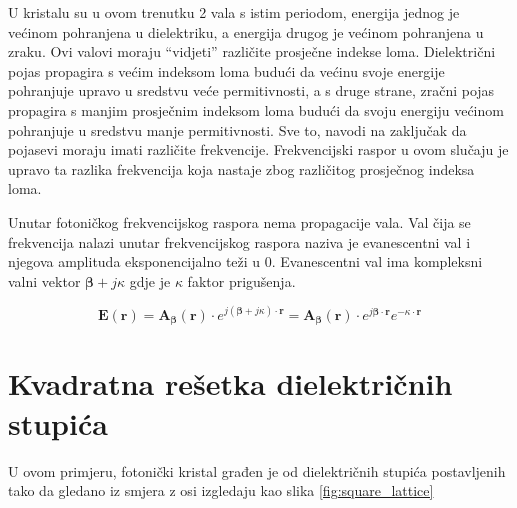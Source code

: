 \documentclass[utf8, seminar, numeric]{fer}
\begin{document}
U kristalu su u ovom trenutku 2 vala s istim periodom, energija jednog je
većinom pohranjena u dielektriku, a energija drugog je većinom pohranjena
u zraku. Ovi valovi moraju ``vidjeti'' različite prosječne indekse loma.
Dielektrični pojas propagira s većim indeksom loma budući da većinu svoje energije
pohranjuje upravo u sredstvu veće permitivnosti, a s druge strane, zračni pojas
propagira s manjim prosječnim indeksom loma budući da svoju energiju
većinom pohranjuje u sredstvu manje permitivnosti. Sve to, navodi na zaključak
da pojasevi moraju imati različite frekvencije. Frekvencijski raspor u ovom
slučaju je upravo ta razlika frekvencija koja nastaje zbog različitog prosječnog
indeksa loma.

\FloatBarrier
Unutar fotoničkog frekvencijskog raspora nema propagacije vala. Val čija se
frekvencija nalazi unutar frekvencijskog raspora naziva je evanescentni val i
njegova amplituda eksponencijalno teži u 0. Evanescentni val ima kompleksni valni
vektor ${\bm{\beta}} + j \kappa$ gdje je $\kappa$ faktor prigušenja.

\begin{equation} \label{eq:evan}
	\mathbf{E}(\mathbf{r}) =
	\mathbf{A}_{\bm{\beta}}(\mathbf{r}) \cdot
		e^{j ({\bm{\beta}} + j \kappa) \cdot \mathbf{r}} =
	\mathbf{A}_{\bm{\beta}}(\mathbf{r}) \cdot
		e^{j {\bm{\beta}} \cdot \mathbf{r}} e^{-\kappa \cdot \mathbf{r}}
\end{equation}


\section{Kvadratna rešetka dielektričnih stupića}

U ovom primjeru, fotonički kristal građen je od dielektričnih stupića
postavljenih tako da gledano iz smjera z osi izgledaju kao slika
\ref{fig:square_lattice}
\end{document}
